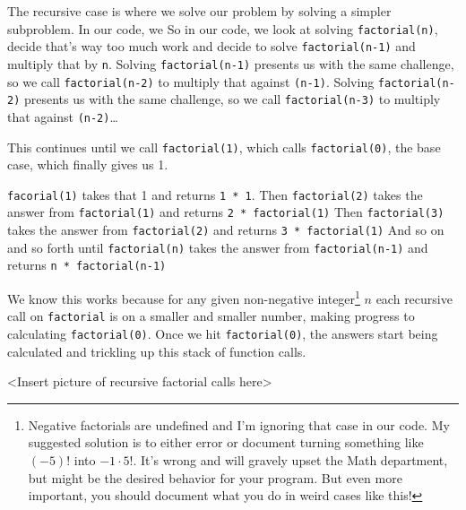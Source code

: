 The recursive case is where we solve our problem by solving a simpler subproblem.
In our code, we
So in our code, we look at solving \texttt{factorial(n)}, decide that's way too much work and decide to solve \texttt{factorial(n-1)} and multiply that by \texttt{n}.
Solving \texttt{factorial(n-1)} presents us with the same challenge, so we call \texttt{factorial(n-2)} to multiply that against \texttt{(n-1)}.  
Solving \texttt{factorial(n-2)} presents us with the same challenge, so we call \texttt{factorial(n-3)} to multiply that against \texttt{(n-2)}\dots  

This continues until we call \texttt{factorial(1)}, which calls \texttt{factorial(0)}, the base case, which finally gives us 1.  

\texttt{facorial(1)} takes that 1 and returns \texttt{1 * 1}. 
Then \texttt{factorial(2)} takes the answer from \texttt{factorial(1)} and returns \texttt{2 * \texttt{factorial(1)}}
Then \texttt{factorial(3)} takes the answer from \texttt{factorial(2)} and returns \texttt{3 * \texttt{factorial(1)}}
And so on and so forth until \texttt{factorial(n)} takes the answer from \texttt{factorial(n-1)} and returns \texttt{n * \texttt{factorial(n-1)}}

We know this works because for any given non-negative integer\footnote{Negative factorials are undefined and I'm ignoring that case in our code. My suggested solution is to either error or document turning something like $(-5)!$ into $-1 \cdot 5!$.  It's wrong and will gravely upset the Math department, but might be the desired behavior for your program.  But even more important, you should document what you do in weird cases like this!} $n$  each recursive call on \texttt{factorial} is on a smaller and smaller number, making progress to calculating \texttt{factorial(0)}. Once we hit \texttt{factorial(0)}, the answers start being calculated and trickling up this stack of function calls.


<Insert picture of recursive factorial calls here>


